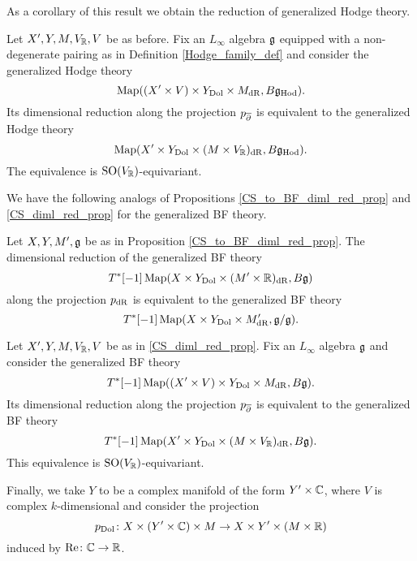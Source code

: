 \documentclass[10pt, oneside]{article}
\begin{document}
As a corollary of this result we obtain the reduction of generalized Hodge theory.

\begin{corollary}
Let $X', Y, M, V_\mathbb R, V$ be as before. 
Fix an $L_\infty$ algebra $\mathfrak g$ equipped with a non-degenerate pairing as in Definition \ref{Hodge_family_def} and consider the generalized Hodge theory
\[\operatorname{Map}((X'\times V)\times Y_{\mathrm{Dol}}\times M_{\mathrm{dR}}, B\mathfrak g_{\mathrm{Hod}}).\]
Its dimensional reduction along the projection $p_{\overline{\partial}}$ is equivalent to the generalized Hodge theory
\[\operatorname{Map}(X'\times Y_{\mathrm{Dol}}\times (M\times V_\mathbb R)_{\mathrm{dR}}, B\mathfrak g_{\mathrm{Hod}}).\]
The equivalence is $\mathrm{SO}(V_\mathbb R)$-equivariant.
\label{cor:Hodgeholomorphicreduction}
\end{corollary}

We have the following analogs of Propositions \ref{CS_to_BF_diml_red_prop} and \ref{CS_diml_red_prop} for the generalized BF theory.

\begin{prop}
Let $X, Y, M', \mathfrak g$ be as in Proposition \ref{CS_to_BF_diml_red_prop}. The dimensional reduction of the generalized BF theory
\[T^*[-1]\operatorname{Map}(X\times Y_{\mathrm{Dol}}\times (M'\times \mathbb R)_{\mathrm{dR}}, B\mathfrak g)\]
along the projection $p_{\rm dR}$ is equivalent to the generalized BF theory
\[
T^*[-1] \operatorname{Map}(X\times Y_{\mathrm{Dol}}\times M'_{\mathrm{dR}}, \mathfrak g/\mathfrak g).
\]
\label{prop:BFdeRhamreduction}
\end{prop}

\begin{prop}
Let $X', Y, M, V_\mathbb R, V$ be as in \ref{CS_diml_red_prop}. Fix an $L_\infty$ algebra $\mathfrak g$ and consider the generalized BF theory
\[T^*[-1] \operatorname{Map}((X'\times V)\times Y_{\mathrm{Dol}}\times M_{\mathrm{dR}}, B\mathfrak g).\]
Its dimensional reduction along the projection $p_{\overline{\partial}}$ is equivalent to the generalized BF theory
\[T^*[-1] \operatorname{Map}(X'\times Y_{\mathrm{Dol}}\times (M\times V_\mathbb R)_{\mathrm{dR}}, B\mathfrak g).\]
This equivalence is $\mathrm{SO}(V_\mathbb R)$-equivariant.
\label{prop:BFholomorphicreduction}
\end{prop}

Finally, we take $Y$ to be a complex manifold of the form $Y' \times \mathbb C$, where $V$ is complex $k$-dimensional and consider the projection
\[
p_{\rm Dol} \colon X \times (Y' \times \mathbb C) \times M \to X \times Y' \times (M \times \mathbb R) 
\]
induced by ${\rm Re} \colon \mathbb C \to \mathbb R$.
\end{document}
